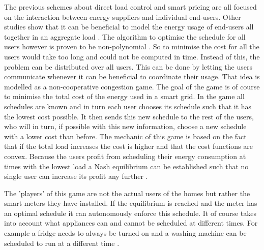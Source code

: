 The previous schemes about direct load control and smart pricing are all focused on the interaction between energy suppliers and individual end-users. Other studies show that it can be beneficial to model the energy usage of end-users all together in an aggregate load \cite{Mohsenian-RadWongJatskevichEtAl2010a, SalinasLiLi2013, ZhuTangLambotharanEtAl2011}. The algorithm to optimise the schedule for all users however is proven to be non-polynomial \cite{CaronKesidis2010}. So to minimise the cost for all the users would take too long and could not be computed in time. Instead of this, the problem can be distributed over all users. This can be done by letting the users communicate whenever it can be beneficial to coordinate their usage. That idea is modelled as a non-cooperative congestion game. The goal of the game is of course to minimise the total cost of the energy used in a smart grid. In the game all schedules are known and in turn each user chooses its schedule such that it has the lowest cost possible. It then sends this new schedule to the rest of the users, who will in turn, if possible with this new information, choose a new schedule with a lower cost than before. The mechanic of this game is based on the fact that if the total load increases the cost is higher and that the cost functions are convex. Because the users profit from scheduling their energy consumption at times with the lowest load a Nash equilibrium can be established such that no single user can increase its profit any further \cite{Mohsenian-RadWongJatskevichEtAl2010a, ZhuTangLambotharanEtAl2011, IbarsNavarroGiupponi2010}.

The 'players' of this game are not the actual users of the homes but rather the smart meters they have installed. If the equilibrium is reached and the meter has an optimal schedule it can autonomously enforce this schedule. It of course takes into account what appliances can and cannot be scheduled at different times. For example a fridge needs to always be turned on and a washing machine can be scheduled to run at a different time \cite{DepuruWangDevabhaktuni2011a}. 

